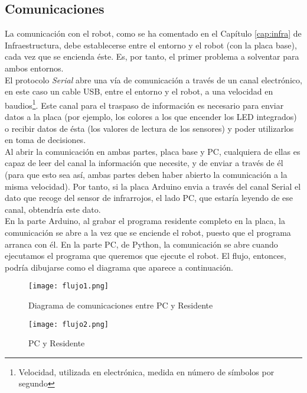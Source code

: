 \subsection{Comunicaciones}\label{subsec:comunicaciones}
La comunicación con el robot, como se ha comentado en el Capítulo \ref{cap:infra} de Infraestructura, debe establecerse entre el entorno y el robot (con la placa base), cada vez que se encienda éste. Es, por tanto, el primer problema a solventar para ambos entornos. \\ 
El protocolo \textit{Serial} abre una vía de comunicación a través de un canal electrónico, en este caso un cable USB, entre el entorno y el robot, a una velocidad en baudios\footnote{Velocidad, utilizada en electrónica, medida en número de símbolos por segundo}. Este canal para el traspaso de información es necesario para enviar datos a la placa (por ejemplo, los colores a los que encender los LED integrados) o recibir datos de ésta (los valores de lectura de los sensores) y poder utilizarlos en toma de decisiones. \\
Al abrir la comunicación en ambas partes, placa base y PC, cualquiera de ellas es capaz de leer del canal la información que necesite, y de enviar a través de él (para que esto sea así, ambas partes deben haber abierto la comunicación a la misma velocidad). Por tanto, si la placa Arduino envia a través del canal Serial el dato que recoge del sensor de infrarrojos, el lado PC, que estaría leyendo de ese canal, obtendría este dato. \\
En la parte Arduino, al grabar el programa residente completo en la placa, la comunicación se abre a la vez que se enciende el robot, puesto que el programa arranca con él. En la parte PC, de Python, la comunicación se abre cuando ejecutamos el programa que queremos que ejecute el robot. El flujo, entonces, podría dibujarse como el diagrama que aparece a continuación.
\begin{figure}[h]
	\texttt{[image: flujo1.png]}
	\centering
	\label{img:FlujoComunicaciones}
	\caption{Diagrama de comunicaciones entre PC y Residente}
\end{figure}

\begin{figure}[h]
	\texttt{[image: flujo2.png]}
	\centering
	\label{img:FlujoComunicaciones2}
	\caption{PC y Residente}
\end{figure}

